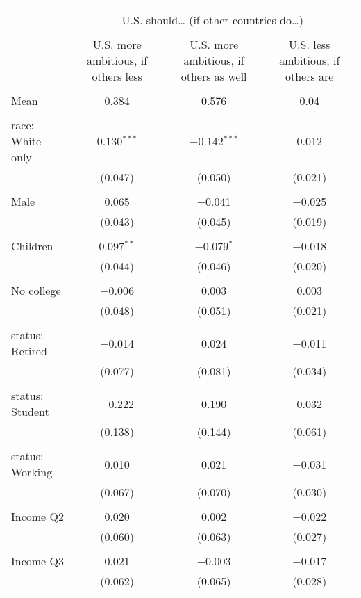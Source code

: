 
\begin{tabular}{@{\extracolsep{5pt}}lccc} 
\\[-1.8ex]\hline 
\hline \\[-1.8ex] 
 & \multicolumn{3}{c}{U.S. should… (if other countries do…)} \\ 
\cline{2-4} 
\\[-1.8ex] & U.S. more ambitious, if others less & U.S. more ambitious, if others as well & U.S. less ambitious, if others are \\ 
\hline \\[-1.8ex] 
 Mean & 0.384 & 0.576 & 0.04  \\ \hline \\[-1.8ex] race: White only & 0.130$^{***}$ & $-$0.142$^{***}$ & 0.012 \\ 
  & (0.047) & (0.050) & (0.021) \\ 
  & & & \\ 
 Male & 0.065 & $-$0.041 & $-$0.025 \\ 
  & (0.043) & (0.045) & (0.019) \\ 
  & & & \\ 
 Children & 0.097$^{**}$ & $-$0.079$^{*}$ & $-$0.018 \\ 
  & (0.044) & (0.046) & (0.020) \\ 
  & & & \\ 
 No college & $-$0.006 & 0.003 & 0.003 \\ 
  & (0.048) & (0.051) & (0.021) \\ 
  & & & \\ 
 status: Retired & $-$0.014 & 0.024 & $-$0.011 \\ 
  & (0.077) & (0.081) & (0.034) \\ 
  & & & \\ 
 status: Student & $-$0.222 & 0.190 & 0.032 \\ 
  & (0.138) & (0.144) & (0.061) \\ 
  & & & \\ 
 status: Working & 0.010 & 0.021 & $-$0.031 \\ 
  & (0.067) & (0.070) & (0.030) \\ 
  & & & \\ 
 Income Q2 & 0.020 & 0.002 & $-$0.022 \\ 
  & (0.060) & (0.063) & (0.027) \\ 
  & & & \\ 
 Income Q3 & 0.021 & $-$0.003 & $-$0.017 \\ 
  & (0.062) & (0.065) & (0.028) \\ 

\end{tabular}
